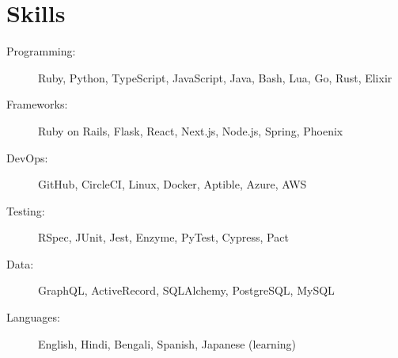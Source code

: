 \documentclass[11pt]{article} %
\begin{document}
\section{Skills}
\begin{description}
  \item[Programming:] Ruby, Python, TypeScript, JavaScript, Java, Bash, Lua, Go, Rust, Elixir
  \item[Frameworks:] Ruby on Rails, Flask, React, Next.js, Node.js, Spring, Phoenix
  \item[DevOps:] GitHub, CircleCI, Linux, Docker, Aptible, Azure, AWS
  \item[Testing:] RSpec, JUnit, Jest, Enzyme, PyTest, Cypress, Pact
  \item[Data:] GraphQL, ActiveRecord, SQLAlchemy, PostgreSQL, MySQL
  \item[Languages:] English, Hindi, Bengali, Spanish, Japanese (learning)
\end{description}
\end{document}
